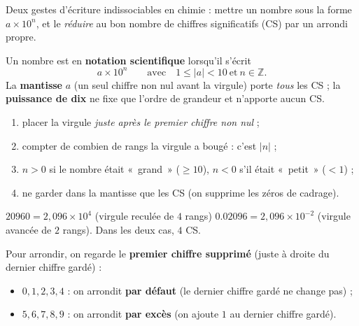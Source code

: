 \documentclass[11pt,a4paper]{article}
\begin{document}

Deux gestes d'écriture indissociables en chimie : mettre un nombre sous la forme $a\times10^{n}$, et le
\emph{réduire} au bon nombre de chiffres significatifs (CS) par un arrondi propre.

\begin{cle}
Un nombre est en \textbf{notation scientifique} lorsqu'il s'écrit
\[ a\times10^{n}\qquad\text{avec}\quad 1\le |a|<10\ \text{et}\ n\in\mathbb{Z}. \]
La \textbf{mantisse} $a$ (un seul chiffre non nul avant la virgule) porte \emph{tous} les CS ; la
\textbf{puissance de dix} ne fixe que l'ordre de grandeur et n'apporte aucun CS.
\end{cle}

\begin{methode}
\begin{enumerate}[label=\arabic*.,leftmargin=1.8em,topsep=2pt,itemsep=1pt]
  \item placer la virgule \emph{juste après le premier chiffre non nul} ;
  \item compter de combien de rangs la virgule a bougé : c'est $|n|$ ;
  \item $n>0$ si le nombre était «~grand~» ($\ge10$), $n<0$ s'il était «~petit~» ($<1$) ;
  \item ne garder dans la mantisse que les CS (on supprime les zéros de cadrage).
\end{enumerate}
\end{methode}

\begin{exemplebox}
$\num{20960}=2,096\times10^{4}$ \quad(virgule reculée de $4$ rangs)\qquad
$\num{0,02096}=2,096\times10^{-2}$ \quad(virgule avancée de $2$ rangs). Dans les deux cas, $4$ CS.
\end{exemplebox}

\begin{cle}
Pour arrondir, on regarde le \textbf{premier chiffre supprimé} (juste à droite du dernier chiffre gardé) :
\begin{itemize}[leftmargin=1.6em,topsep=2pt,itemsep=1pt]
  \item $0,1,2,3,4$ : on arrondit \textbf{par défaut} (le dernier chiffre gardé ne change pas) ;
  \item $5,6,7,8,9$ : on arrondit \textbf{par excès} (on ajoute $1$ au dernier chiffre gardé).
\end{itemize}
\end{cle}
\end{document}
